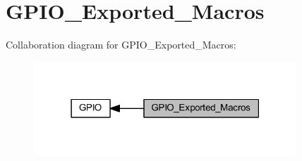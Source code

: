 \hypertarget{group___g_p_i_o___exported___macros}{}\section{G\+P\+I\+O\+\_\+\+Exported\+\_\+\+Macros}
\label{group___g_p_i_o___exported___macros}
Collaboration diagram for G\+P\+I\+O\+\_\+\+Exported\+\_\+\+Macros\+:
\nopagebreak
\begin{figure}[H]
\begin{center}
\leavevmode
\includegraphics[width=279pt]{group___g_p_i_o___exported___macros}
\end{center}
\end{figure}
